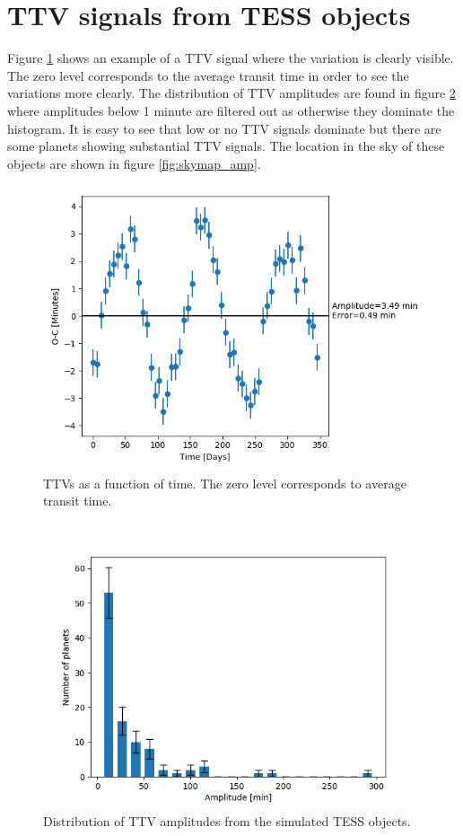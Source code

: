 \documentclass[12pt]{report}
\begin{document}
\section{TTV signals from TESS objects}
	Figure \ref{fig:TTV1} shows an example of a TTV signal where the variation is clearly visible. The zero level corresponds to the average transit time in order to see the variations more clearly. The distribution of TTV amplitudes are found in figure \ref{fig:ampl_histo} where amplitudes below 1 minute are filtered out as otherwise they dominate the histogram. It is easy to see that low or no TTV signals dominate but there are some planets showing substantial TTV signals. The location in the sky of these objects are shown in figure \ref{fig:skymap_amp}.
\begin{figure}[h]
 	 \centering
	  \includegraphics[width=\textwidth]{img/232_1.png}
	  \caption{TTVs as a function of time. The zero level corresponds to average transit time.}
	 \label{fig:TTV1}
\end{figure}
\begin{figure}[h!]
 	 \centering
	  \includegraphics[width=\textwidth]{img/ampl_tess_400.png}
	  \caption{Distribution of TTV amplitudes from the simulated TESS objects.}
	 \label{fig:ampl_histo}
\end{figure}
\end{document}
